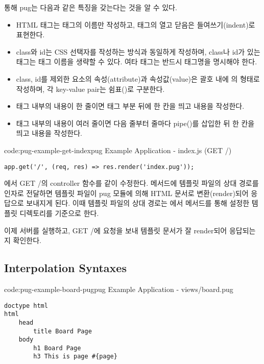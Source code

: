 \를 통해 pug는 다음과 같은 특징을 갖는다는 것을 알 수 있다.

\begin{itemize}
    \item HTML 태그는 태그의 이름만 작성하고, 태그의 열고 닫음은 들여쓰기(indent)로 표현한다.
    \item class와 id는 CSS 선택자를 작성하는 방식과 동일하게 작성하며, class나 id가 있는  태그는 태그 이름을 생략할 수 있다. 여타 태그는 반드시 태그명을 명시해야 한다.
    \item class, id를 제외한 요소의 속성(attribute)과 속성값(value)은 괄호 내에 의 형태로 작성하며, 각 key-value pair는 쉼표(\cd{,})로 구분한다.
    \item 태그 내부의 내용이 한 줄이면 태그 부분 뒤에 한 칸을 띄고 내용을 작성한다.
    \item 태그 내부의 내용이 여러 줄이면 다음 줄부터 줄마다 pipe(\cd{|})를 삽입한 뒤 한 칸을 띄고 내용을 작성한다.
\end{itemize}

\begin{code}{code:pug-example-get-index}{pug Example Application - index.js (GET /)}
\begin{verbatim}
app.get('/', (req, res) => res.render('index.pug'));
\end{verbatim}
\end{code}

에서 GET /의 controller 함수를 \와 같이 수정한다.  메서드에 템플릿 파일의 상대 경로를 인자로 전달하면 템플릿 파일이 pug 모듈에 의해 HTML 문서로 변환(render)되어 응답으로 보내지게 된다. 이때 템플릿 파일의 상대 경로는 에서  메서드를 통해 설정한 템플릿 디렉토리를 기준으로 한다.

이제 서버를 실행하고, GET /에 요청을 보내 템플릿 문서가 잘 render되어 응답되는지 확인한다.

\subsection*{Interpolation Syntaxes}

\begin{code}{code:pug-example-board-pug}{pug Example Application - views/board.pug}
\begin{verbatim}
doctype html
html
    head
        title Board Page
    body
        h1 Board Page
        h3 This is page #{page}
\end{verbatim}
\end{code}


